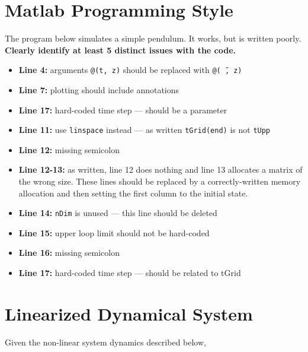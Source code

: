 
\pagebreak
\section{Matlab Programming Style}
The program below simulates a simple pendulum. It works, but is written poorly. \\
\textbf{Clearly identify at least 5 distinct issues with the code.}

\lstset{stepnumber=1}


\begin{itemize}
  \item \textbf{Line 4:} arguments \texttt{@(t, z)} should be replaced with \texttt{@(\~ \,, z)}
  \item \textbf{Line 7:} plotting should include annotations
  \item \textbf{Line 17:} hard-coded time step --- should be a parameter
  \item \textbf{Line 11:} use \texttt{linspace} instead --- as written \texttt{tGrid(end)} is not \texttt{tUpp}
  \item \textbf{Line 12:} missing semicolon
  \item \textbf{Line 12-13:} as written, line 12 does nothing and line 13 allocates a matrix of the wrong size.
    These lines should be replaced by a correctly-written memory allocation
    and then setting the first column to the initial state.
  \item \textbf{Line 14:} \texttt{nDim} is unused --- this line should be deleted
  \item \textbf{Line 15:} upper loop limit should not be hard-coded
  \item \textbf{Line 16:} missing semicolon
  \item \textbf{Line 17:} hard-coded time step --- should be related to tGrid
\end{itemize}




\pagebreak
\section{Linearized Dynamical System}

Given the non-linear system dynamics described below,

